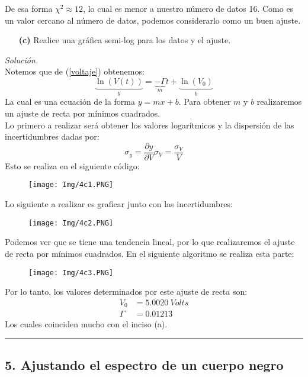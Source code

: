 \documentclass[11pt]{article}
\begin{document}
	De esa forma $\chi^2 \approx 12$, lo cual es menor a nuestro número de datos 16. Como es un valor cercano al número de datos, podemos considerarlo como un buen ajuste.
	
\begin{enumerate}
	\item [\textbf{(c)}] Realice una gráfica semi-log para los datos y el ajuste.
\end{enumerate}	
\textit{Solución.}\\	
	Notemos que de (\ref{voltaje}) obtenemos:
	$$\underbrace{\ln (V(t))}_y = \underbrace{-\Gamma}_m t +\underbrace{\ln (V_0)}_b$$
	La cual es una ecuación de la forma $y = mx + b$. Para obtener $m$ y $b$ realizaremos un ajuste de recta por mínimos cuadrados. \\
	Lo primero a realizar será obtener los valores logarítmicos y la dispersión de las incertidumbres dadas por:
	$$\sigma_y =\frac{\partial y}{\partial V} \sigma_V = \frac{\sigma_V}{V}$$
	Esto se realiza en el siguiente código:
	\begin{figure}[h!]
		\centering
		\texttt{[image: Img/4c1.PNG]}
	\end{figure}
	
	Lo siguiente a realizar es graficar junto con las incertidumbres:
\newpage
	\begin{figure}[h!]
		\centering
		\texttt{[image: Img/4c2.PNG]}
	\end{figure}

	Podemos ver que se tiene una tendencia lineal, por lo que realizaremos el ajuste de recta por mínimos cuadrados. En el siguiente algoritmo se realiza esta parte:
	\begin{figure}[h!]
		\centering
		\texttt{[image: Img/4c3.PNG]}
	\end{figure}
	
	Por lo tanto, los valores determinados por este ajuste de recta son:
	\begin{align*}
		V_0 &= \SI{5.0020}{Volts}	\\
		\Gamma &= 0.01213
	\end{align*}
	Los cuales coinciden mucho con el inciso (a).
\hrule
\subsection*{\textbf{5. Ajustando el espectro de un cuerpo negro}}
\end{document}
